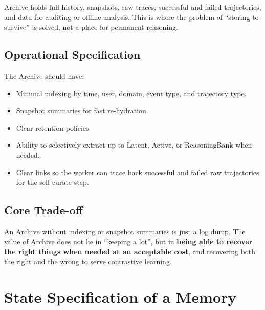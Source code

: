 \documentclass[a4paper,12pt]{article}
\begin{document}
Archive holds full history, snapshots, raw traces, successful and failed trajectories, and data for auditing or offline analysis. This is where the problem of ``storing to survive'' is solved, not a place for permanent reasoning.

\subsection*{Operational Specification}

The Archive should have:
\begin{itemize}
    \item Minimal indexing by time, user, domain, event type, and trajectory type.
    \item Snapshot summaries for fast re-hydration.
    \item Clear retention policies.
    \item Ability to selectively extract up to Latent, Active, or ReasoningBank when needed.
    \item Clear links so the worker can trace back successful and failed raw trajectories for the self-curate step.
\end{itemize}

\subsection*{Core Trade-off}

An Archive without indexing or snapshot summaries is just a log dump. The value of Archive does not lie in ``keeping a lot'', but in \textbf{being able to recover the right things when needed at an acceptable cost}, and recovering both the right and the wrong to serve contrastive learning.

\section{State Specification of a Memory}
\end{document}
